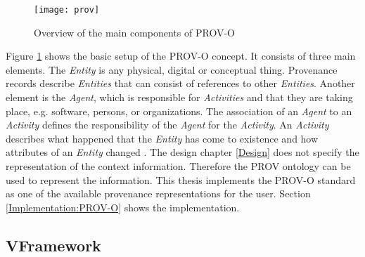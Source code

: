 \documentclass[draft,final]{vutinfth} %
\begin{document}
\begin{figure}[h]
	\centering
	\texttt{[image: prov]}
	\caption{Overview of the main components of PROV-O \cite{733f89c65e4844f9aabcae1c276a5602}}
	\label{fig:prov} %
\end{figure}

Figure \ref{fig:prov} shows the basic setup of the PROV-O concept. It consists of three main elements. The \textit{Entity} is any physical, digital or conceptual thing. Provenance records describe \textit{Entities} that can consist of references to other \textit{Entities}. Another element is the \textit{Agent}, which is responsible for \textit{Activities} and that they are taking place, e.g. software, persons, or organizations. The association of an \textit{Agent} to an \textit{Activity} defines the responsibility of the \textit{Agent} for the \textit{Activity}. An \textit{Activity} describes what happened that the \textit{Entity} has come to existence and how attributes of an \textit{Entity} changed \cite{733f89c65e4844f9aabcae1c276a5602}. The design chapter \ref{Design} does not specify the representation of the context information. Therefore the PROV ontology can be used to represent the information. {This thesis implements the PROV-O standard as one of the available provenance representations for the user. Section \ref{Implementation:PROV-O} shows the implementation.}
\subsection{VFramework}\label{vframework}
\end{document}
